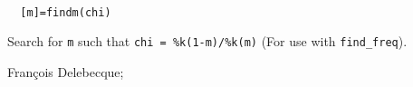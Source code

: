 
\begin{mandesc}
   \\ %
\end{mandesc}
\begin{calling_sequence}
\begin{verbatim}
  [m]=findm(chi)  
\end{verbatim}
\end{calling_sequence}
\begin{mandescription}
  Search for \verb!m! such that \verb!chi = %k(1-m)/%k(m)!
  (For use with \verb!find_freq!).
\end{mandescription}
\begin{manseealso}
\end{manseealso}
\begin{authors}
  Fran\c{c}ois  Delebecque;   
\end{authors}
